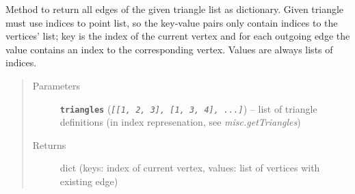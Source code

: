 \documentclass[letterpaper,10pt,english]{sphinxmanual}
\begin{document}
\begin{fulllineitems}
\label{pk_src.misc:pk_src.misc.getTriangleEdges}
Method to return all edges of the given triangle list as dictionary. Given triangle must use indices to point list, so the key-value pairs only contain indices to the vertices' list; key is the index of the current vertex and for each outgoing edge the value contains an index to the corresponding vertex. Values are always lists of indices.
\begin{quote}\begin{description}
\item[{Parameters}] \leavevmode
\textbf{\texttt{triangles}} (\emph{\texttt{{[}{[}1, 2, 3{]}, {[}1, 3, 4{]}, ...{]}}}) -- list of triangle definitions (in index represenation, see \emph{misc.getTriangles})

\item[{Returns}] \leavevmode
dict (keys: index of current vertex, values: list of vertices with existing edge)


\end{description}
\end{quote}
\end{fulllineitems}
\end{document}
